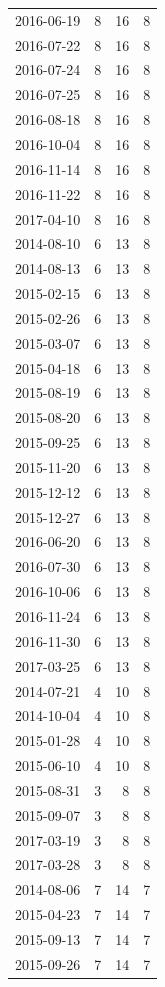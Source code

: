 \begin{tabular}{lrrr}
2016-06-19 & 8 & 16 & 8 \\
2016-07-22 & 8 & 16 & 8 \\
2016-07-24 & 8 & 16 & 8 \\
2016-07-25 & 8 & 16 & 8 \\
2016-08-18 & 8 & 16 & 8 \\
2016-10-04 & 8 & 16 & 8 \\
2016-11-14 & 8 & 16 & 8 \\
2016-11-22 & 8 & 16 & 8 \\
2017-04-10 & 8 & 16 & 8 \\
2014-08-10 & 6 & 13 & 8 \\
2014-08-13 & 6 & 13 & 8 \\
2015-02-15 & 6 & 13 & 8 \\
2015-02-26 & 6 & 13 & 8 \\
2015-03-07 & 6 & 13 & 8 \\
2015-04-18 & 6 & 13 & 8 \\
2015-08-19 & 6 & 13 & 8 \\
2015-08-20 & 6 & 13 & 8 \\
2015-09-25 & 6 & 13 & 8 \\
2015-11-20 & 6 & 13 & 8 \\
2015-12-12 & 6 & 13 & 8 \\
2015-12-27 & 6 & 13 & 8 \\
2016-06-20 & 6 & 13 & 8 \\
2016-07-30 & 6 & 13 & 8 \\
2016-10-06 & 6 & 13 & 8 \\
2016-11-24 & 6 & 13 & 8 \\
2016-11-30 & 6 & 13 & 8 \\
2017-03-25 & 6 & 13 & 8 \\
2014-07-21 & 4 & 10 & 8 \\
2014-10-04 & 4 & 10 & 8 \\
2015-01-28 & 4 & 10 & 8 \\
2015-06-10 & 4 & 10 & 8 \\
2015-08-31 & 3 & 8 & 8 \\
2015-09-07 & 3 & 8 & 8 \\
2017-03-19 & 3 & 8 & 8 \\
2017-03-28 & 3 & 8 & 8 \\
2014-08-06 & 7 & 14 & 7 \\
2015-04-23 & 7 & 14 & 7 \\
2015-09-13 & 7 & 14 & 7 \\
2015-09-26 & 7 & 14 & 7 \\

\end{tabular}
